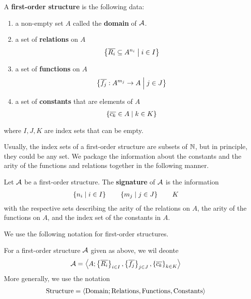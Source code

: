 \begin{boxdefinition}\label{Ch2:Def:First-Order_Structure}
    A \textbf{first-order structure} is the following data:
    \begin{enumerate}
        \item a non-empty set $A$ called the \textbf{domain} of $\mathcal{A}$.
        
        \item a set of \textbf{relations} on $A$
        \begin{align*}
            \left\{ \overline{R_i} \subseteq A^{n_i} \; \middle\vert \; i \in I \right\}
        \end{align*}

        \item a set of \textbf{functions} on $A$
        \begin{align*}
            \left\{ \overline{f_j} : A^{m_j} \to A \; \middle\vert \; j \in J \right\}
        \end{align*}

        \item a set of \textbf{constants} that are elements of $A$
        \begin{align*}
            \left\{ \overline{c_k} \in A \; \middle\vert \; k \in K \right\}
        \end{align*}
    \end{enumerate}
    where $I, J, K$ are index sets that can be empty.
\end{boxdefinition}

Usually, the index sets of a first-order structure are subsets of $\mathbb{N}$, but in principle, they could be any set. We package the information about the constants and the arity of the functions and relations together in the following manner.

\begin{boxdefinition}[Signature]
    Let $\mathcal{A}$ be a first-order structure. The \textbf{signature} of $\mathcal{A}$ is the information
    \begin{align*}
        \left\{ n_i \; \middle\vert \; i \in I \right\}
        \qquad
        \left\{ m_j \; \middle\vert \; j \in J \right\}
        \qquad
        K
    \end{align*}
    with the respective sets describing the arity of the relations on $A$, the arity of the functions on $A$, and the index set of the constants in $A$.
\end{boxdefinition}

We use the following notation for first-order structures.

\begin{boxconvention}
    For a first-order structure $\mathcal{A}$ given as above, we wil deonte
    \begin{align*}
        \mathcal{A} = \left\langle A; \left\{ \overline{R_i} \right\}_{i \in I}, \left\{ \overline{f_j} \right\}_{j \in J}, \left\{ \overline{c_k} \right\}_{k \in K} \right\rangle
    \end{align*}
    More generally, we use the notation
    \begin{align*}
        \text{Structure} = \left\langle \text{Domain}; \text{Relations}, \text{Functions}, \text{Constants} \right\rangle
    \end{align*}
\end{boxconvention}

